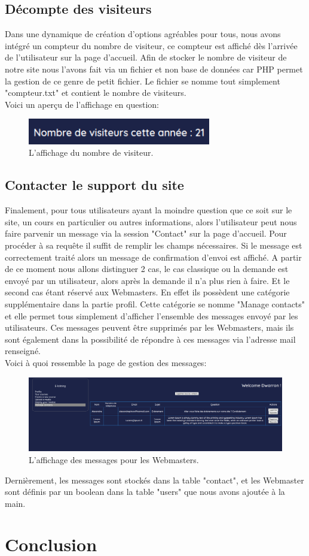 \documentclass[a4paper,10pt]{article}
\begin{document}
\subsection{Décompte des visiteurs}
Dans une dynamique de création d'options agréables pour tous, nous avons intégré un compteur du nombre de visiteur, ce compteur est affiché dès l'arrivée de l'utilisateur sur la page d'accueil. Afin de stocker le nombre de visiteur de notre site nous l'avons fait via un fichier et non base de données car PHP permet la gestion de ce genre de petit fichier. Le fichier se nomme tout simplement "compteur.txt" et contient le nombre de visiteurs.\\

Voici un aperçu de l'affichage en question: 
\begin{figure}[!h]
\centerline{\includegraphics[width=8cm]{images/numberVisiteurs.PNG}}
\caption{L'affichage du nombre de visiteur.}
\label{fig}
\end{figure}

\subsection{Contacter le support du site}
Finalement, pour tous utilisateurs ayant la moindre question que ce soit sur le site, un cours en particulier ou autres informations, alors l'utilisateur peut nous faire parvenir un message via la session "Contact" sur la page d'accueil. Pour procéder à sa requête il suffit de remplir les champs nécessaires. Si le message est correctement traité alors un message de confirmation d'envoi est affiché. A partir de ce moment nous allons distinguer 2 cas, le cas classique ou la demande est envoyé par un utilisateur, alors après la demande il n'a plus rien à faire. Et le second cas étant réservé aux Webmasters. En effet ils possèdent une catégorie supplémentaire dans la partie profil. Cette catégorie se nomme "Manage contacts" et elle permet tous simplement d'afficher l'ensemble des messages envoyé par les utilisateurs. Ces messages peuvent être supprimés par les Webmasters, mais ils sont également dans la possibilité de répondre à ces messages via l'adresse mail renseigné.\\

Voici à quoi ressemble la page de gestion des messages:
\begin{figure}[!h]
\centerline{\includegraphics[width=16cm]{images/manageContact.PNG}}
\caption{L'affichage des messages pour les Webmasters.}
\label{fig}
\end{figure}

Dernièrement, les messages sont stockés dans la table "contact", et les Webmaster sont définis par un boolean dans la table "users" que nous avons ajoutée à la main.

\section{Conclusion}
\end{document}
